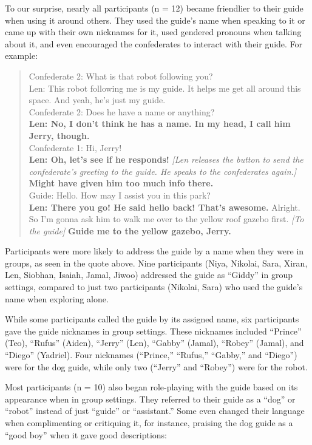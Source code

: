 To our surprise, nearly all participants (n = 12) became friendlier to their guide when using it around others. They used the guide’s name when speaking to it or came up with their own nicknames for it, used gendered pronouns when talking about it, and even encouraged the confederates to interact with their guide. For example:

\begin{quote}
Confederate 2:  What is that robot following you?\\
Len: This robot following me is my guide. It helps me get all around this space. And yeah, he's just my guide.\\
Confederate 2: Does he have a name or anything?\\
\textbf{Len: No, I don't think he has a name. In my head, I call him Jerry, though.}\\
Confederate 1: Hi, Jerry!\\
\textbf{Len: Oh, let's see if he responds!} \textit{[Len releases the button to send the confederate’s greeting to the guide. He speaks to the confederates again.]} \textbf{Might have given him too much info there.}\\
Guide: Hello. How may I assist you in this park?\\
\textbf{Len: There you go! He said hello back! That's awesome.} Alright. So I'm gonna ask him to walk me over to the yellow roof gazebo first. \textit{[To the guide]} \textbf{Guide me to the yellow gazebo, Jerry.}
\end{quote}

Participants were more likely to address the guide by a name when they were in groups, as seen in the quote above. Nine participants (Niya, Nikolai, Sara, Xiran, Len, Siobhan, Isaiah, Jamal, Jiwoo) addressed the guide as “Giddy” in group settings, compared to just two participants (Nikolai, Sara) who used the guide’s name when exploring alone.

While some participants called the guide by its assigned name, six participants gave the guide nicknames in group settings. These nicknames included “Prince” (Teo), “Rufus” (Aiden), “Jerry” (Len), “Gabby” (Jamal), “Robey” (Jamal), and “Diego” (Yadriel). Four nicknames (“Prince,” “Rufus,” “Gabby,” and “Diego”) were for the dog guide, while only two (“Jerry” and “Robey”) were for the robot.

Most participants (n = 10) also began role-playing with the guide based on its appearance when in group settings. They referred to their guide as a “dog” or “robot” instead of just “guide” or “assistant.” Some even changed their language when complimenting or critiquing it, for instance, praising the dog guide as a “good boy” when it gave good descriptions:

